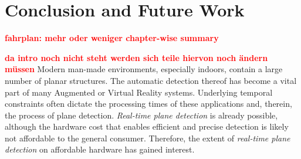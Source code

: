 \documentclass[main.tex]{subfiles}
\begin{document}
\chapter{Conclusion and Future Work}
\label{chap:concl}
\textbf{\textcolor{red}{fahrplan: mehr oder weniger chapter-wise summary}}

\textbf{\textcolor{red}{da intro noch nicht steht werden sich teile hiervon noch ändern müssen}}
Modern man-made environments, especially indoors, contain a large number of planar structures. The automatic detection thereof has become a vital part of many Augmented or Virtual Reality systems. Underlying temporal constraints often dictate the processing times of these applications and, therein, the process of plane detection. \textit{Real-time plane detection} is already possible, although the hardware cost that enables efficient and precise detection is likely not affordable to the general consumer.
Therefore, the extent of \textit{real-time plane detection} on affordable hardware has gained interest.
\end{document}
